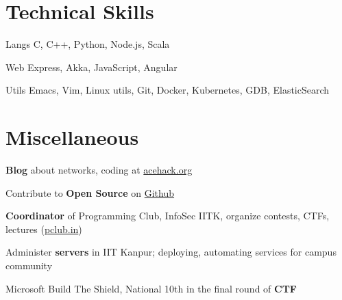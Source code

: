 \documentclass{tccv}
\begin{document}
\vspace{-0.4cm}
\section{Technical Skills}

\begin{factlist}
\item{\small{Langs}}
  {C, C++, Python, Node.js, Scala}

\item{\small{Web}}
  {Express, Akka, JavaScript, Angular}

\item {\small{Utils}}
  {Emacs, Vim, Linux utils, Git, Docker,
    Kubernetes, GDB, ElasticSearch}

\end{factlist}

\vspace{-0.6cm}
\section{Miscellaneous}
\vspace{0.2cm}
\begin{thinitemize}
\item \textbf{Blog} about networks, coding at \href{http://acehack.org}{acehack.org}
\item Contribute to \textbf{Open Source}
  on \href{https://github.com/sakshamsharma}{Github}
\item \textbf{Coordinator} of Programming Club, InfoSec IITK, organize
  contests, CTFs, lectures (\href{http://pclub.in}{pclub.in})
\item Administer \textbf{servers} in IIT Kanpur; deploying,
  automating services for campus community
\item Microsoft Build The Shield, National 10th in the final round of
  \textbf{CTF}
\end{thinitemize}
\end{document}
